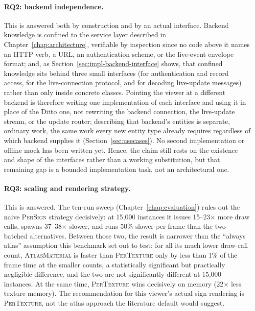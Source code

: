 \paragraph{RQ2: backend independence.} This is answered both by construction and by an actual interface. Backend knowledge is confined to the service layer described in Chapter~\ref{chap:architecture}, verifiable by inspection since no code above it names an HTTP verb, a URL, an authentication scheme, or the live-event envelope format; and, as Section~\ref{sec:impl-backend-interface} shows, that confined knowledge sits behind three small interfaces (for authentication and record access, for the live-connection protocol, and for decoding live-update messages) rather than only inside concrete classes. Pointing the viewer at a different backend is therefore writing one implementation of each interface and using it in place of the Ditto one, not rewriting the backend connection, the live-update stream, or the update router; describing that backend's entities is separate, ordinary work, the same work every new entity type already requires regardless of which backend supplies it (Section~\ref{sec:usecases}). No second implementation or offline mock has been written yet. Hence, the claim still rests on the existence and shape of the interfaces rather than a working substitution, but that remaining gap is a bounded implementation task, not an architectural one.

\paragraph{RQ3: scaling and rendering strategy.} This is answered. The ten-run sweep (Chapter~\ref{chap:evaluation}) rules out the naive \textsc{PerSign} strategy decisively: at 15,000 instances it issues 15--23\(\times\) more draw calls, spawns 37--38\(\times\) slower, and runs 50\% slower per frame than the two batched alternatives. Between those two, the result is narrower than the ``always atlas'' assumption this benchmark set out to test: for all its much lower draw-call count, \textsc{AtlasMaterial} is faster than \textsc{PerTexture} only by less than 1\% of the frame time at the smaller counts, a statistically significant but practically negligible difference, and the two are not significantly different at 15,000 instances. At the same time, \textsc{PerTexture} wins decisively on memory (22\(\times\) less texture memory). The recommendation for this viewer's actual sign rendering is \textsc{PerTexture}, not the atlas approach the literature default would suggest.

